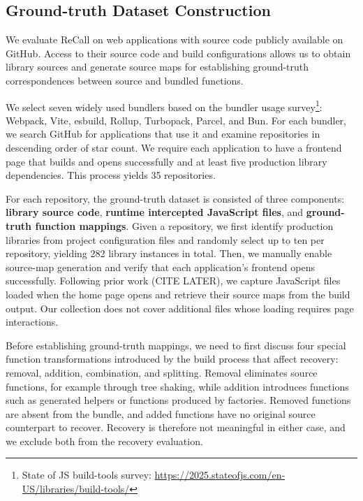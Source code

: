 \subsection{Ground-truth Dataset Construction}
\label{sec:data-collection}

We evaluate ReCall on web applications with source code publicly available on GitHub. Access to their source code and build configurations allows us to obtain library sources and generate source maps for establishing ground-truth correspondences between source and bundled functions.

We select seven widely used bundlers based on the bundler usage survey\footnote{\label{fn:bundler-usage-survey}State of JS build-tools survey: \url{https://2025.stateofjs.com/en-US/libraries/build-tools/}}: Webpack, Vite, esbuild, Rollup, Turbopack, Parcel, and Bun. For each bundler, we search GitHub for applications that use it and examine repositories in descending order of star count. We require each application to have a frontend page that builds and opens successfully and at least five production library dependencies. This process yields 35 repositories.

For each repository, the ground-truth dataset is consisted of three components: \textbf{library source code}, \textbf{runtime intercepted JavaScript files}, and \textbf{ground-truth function mappings}. Given a repository, we first identify production libraries from project configuration files and randomly select up to ten per repository, yielding 282 library instances in total. Then, we manually enable source-map generation and verify that each application’s frontend opens successfully. Following prior work (CITE LATER), we capture JavaScript files loaded when the home page opens and retrieve their source maps from the build output. Our collection does not cover additional files whose loading requires page interactions.

Before establishing ground-truth mappings, we need to first discuss four special function transformations introduced by the build process that affect recovery: removal, addition, combination, and splitting. Removal eliminates source functions, for example through tree shaking, while addition introduces functions such as generated helpers or functions produced by factories. Removed functions are absent from the bundle, and added functions have no original source counterpart to recover. Recovery is therefore not meaningful in either case, and we exclude both from the recovery evaluation.

